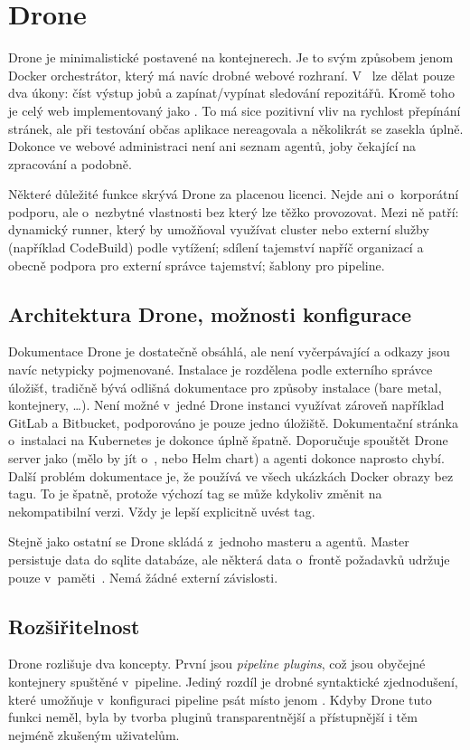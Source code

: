 \section{Drone}
    Drone je minimalistické \CI postavené na kontejnerech. Je to svým způsobem jenom Docker orchestrátor, který má navíc drobné webové rozhraní. V~ lze dělat pouze dva úkony: číst výstup jobů a zapínat/vypínat sledování repozitářů. Kromě toho je celý web implementovaný jako . To má sice pozitivní vliv na rychlost přepínání stránek, ale při testování občas aplikace nereagovala a několikrát se zasekla úplně. Dokonce ve webové administraci není ani seznam agentů, joby čekající na zpracování a podobně.

    Některé důležité funkce skrývá Drone za placenou licenci. Nejde ani o~korporátní podporu, ale o~nezbytné vlastnosti bez který lze \CI těžko provozovat. Mezi ně patří: dynamický runner, který by umožňoval využívat cluster nebo externí služby (například  CodeBuild) podle vytížení; sdílení tajemství napříč organizací a obecně podpora pro externí správce tajemství; šablony pro pipeline.

    \subsection{Architektura Drone, možnosti konfigurace}
        Dokumentace Drone je dostatečně obsáhlá, ale není vyčerpávající a odkazy jsou navíc netypicky pojmenované. Instalace je rozdělena podle externího správce úložišť, tradičně bývá odlišná dokumentace pro způsoby instalace (bare metal, kontejnery, \ldots). Není možné v~jedné Drone instanci využívat zároveň například GitLab a Bitbucket, podporováno je pouze jedno úložiště. Dokumentační stránka o~instalaci na Kubernetes je dokonce úplně špatně. Doporučuje spouštět Drone server jako  (mělo by jít o~, nebo Helm chart) a agenti dokonce naprosto chybí. Další problém dokumentace je, že používá ve všech ukázkách Docker obrazy bez tagu. To je špatně, protože výchozí tag  se může kdykoliv změnit na nekompatibilní verzi. Vždy je lepší explicitně uvést tag.

        Stejně jako ostatní \CI se Drone skládá z~jednoho masteru a agentů. Master persistuje data do sqlite databáze, ale některá data o~frontě požadavků udržuje pouze v~paměti~\cite{drone-ha}. Nemá žádné externí závislosti.

    \subsection{Rozšiřitelnost}
        Drone rozlišuje dva koncepty. První jsou \textit{pipeline plugins}, což jsou obyčejné kontejnery spuštěné v~pipeline. Jediný rozdíl je drobné syntaktické zjednodušení, které umožňuje v~konfiguraci pipeline psát místo  jenom . Kdyby Drone tuto funkci neměl, byla by tvorba pluginů transparentnější a přístupnější i těm nejméně zkušeným uživatelům.

